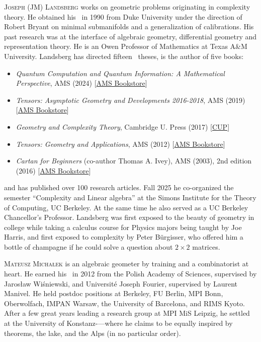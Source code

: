 \documentclass{toc}
\begin{document}
%
%
%
%
%
%
%
%
%
%
%
%
%
%
%
%
%
%
%
%
\begin{tocaboutauthors}
\begin{tocabout}[landsberg]  %
  \textsc{Joseph (JM) Landsberg} %
works on  geometric problems originating in complexity theory. He
obtained his \phd\ in 1990 from Duke University under the direction of Robert Bryant
on minimal submanifolds and a generalization of calibrations. 
His past research  was   at the interface of algebraic geometry, differential geometry 
and representation theory.
He is an Owen Professor of Mathematics at Texas A\&M University. 
Landsberg   has directed 
fifteen  \phd\ theses, is the author of five books:
\begin{itemize}  %
%
\item \emph{Quantum Computation and Quantum Information: A Mathematical Perspective},
%
AMS %
  (2024)
   [\href{https://bookstore.ams.org/view?ProductCode=GSM/243}{AMS Bookstore}] %
\item \emph{Tensors:  Asymptotic Geometry and  Developments 2016-2018}, AMS 
%
(2019)  %
[\href{https://bookstore.ams.org/view?ProductCode=CBMS/132}{AMS Bookstore}] %
\item \emph{Geometry and Complexity Theory},
  Cambridge U. Press (2017)  %
%
  [\href{https://www.cambridge.org/core/books/geometry-and-complexity-theory/15E3ABA3FF14E1054574663F60250D80}{CUP}]  %
\item \emph{Tensors: Geometry and Applications}, AMS (2012)  %
%
[\href{https://bookstore.ams.org/view?ProductCode=GSM/128}{AMS Bookstore}]  %
\item \emph{Cartan for Beginners} (co-author Thomas A. Ivey), 
  AMS (2003), 2nd edition (2016)   %
[\href{https://bookstore.ams.org/view?ProductCode=GSM/175}{AMS Bookstore}]  %
\end{itemize}
and has published over 100 research articles.
Fall 2025 he %
co-organized  %
the semester ``Complexity and Linear algebra'' %
at the Simons Institute for the Theory of Computing, UC Berkeley.
At the same time he   also served as a   UC Berkeley Chancellor's Professor.
Landsberg was first exposed to the beauty of geometry in college while taking
a calculus course for Physics majors being taught by Joe Harris,
and first exposed to complexity by Peter B\"urgisser, who
offered him a bottle of champagne if he could solve a question about
$2\times 2$ matrices. 
\end{tocabout}
%
\begin{tocabout}[michalek]  %
\textsc{Mateusz Micha{\l}ek} is an algebraic geometer by training and a combinatorist at heart. He earned his \phd\ in 2012 from the Polish Academy of Sciences, supervised by Jaros{\l}aw Wi\'sniewski, and Universit\'e Joseph Fourier, supervised by Laurent Manivel. He held postdoc positions at Berkeley, FU Berlin, MPI Bonn, Oberwolfach, IMPAN Warsaw, the University of Barcelona, and RIMS Kyoto. After a few great years leading a research group at MPI MiS Leipzig, he settled at the University of Konstanz-—where he claims to be equally inspired by theorems, the lake, and the Alps (in no particular order).
\end{tocabout}
\end{tocaboutauthors}

%

%
  
%
 
%
\end{document}
